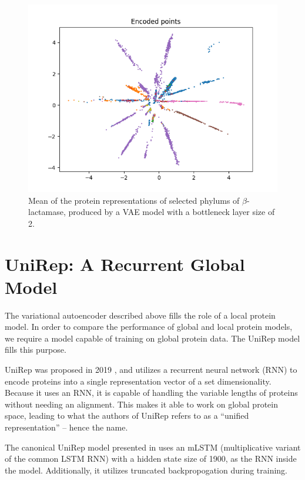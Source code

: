 \begin{figure}[ht]
    \centering
    \includegraphics[width = \linewidth]{report/figures/vae_representation2d.png}
    \caption{Mean of the protein representations of selected phylums of $\beta$-lactamase, produced by a VAE model with a bottleneck layer size of 2.}
    \label{fig:2dimvae}
\end{figure}

\section{UniRep: A Recurrent Global Model}
\label{sec:unirep_experiment}
The variational autoencoder described above fills the role of a local protein model. In order to compare the performance of global and local protein models, we require a model capable of training on global protein data. The UniRep model fills this purpose.

UniRep was proposed in 2019 \cite{alley2019unified}, and utilizes a recurrent neural network (RNN) to encode proteins into a single representation vector of a set dimensionality. Because it uses an RNN, it is capable of handling the variable lengths of proteins without needing an alignment. This makes it able to work on global protein space, leading to what the authors of UniRep refers to as a ``unified representation'' -- hence the name.

The canonical UniRep model presented in \cite{alley2019unified} uses an mLSTM (multiplicative  variant of the common LSTM RNN) with a hidden state size of 1900, as the RNN inside the model. Additionally, it utilizes truncated backpropogation during training.

